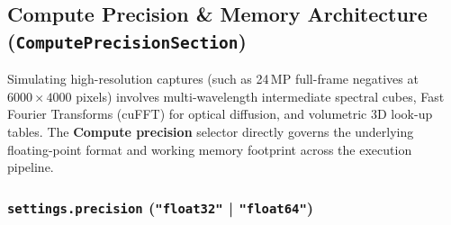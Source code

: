 \documentclass[11pt,a4paper]{article}
\begin{document}
\subsection{Compute Precision \& Memory Architecture (\texttt{ComputePrecisionSection})}

Simulating high-resolution captures (such as 24\,MP full-frame negatives at $6000 \times 4000$ pixels) involves multi-wavelength intermediate spectral cubes, Fast Fourier Transforms (cuFFT) for optical diffusion, and volumetric 3D look-up tables. The \textbf{Compute precision} selector directly governs the underlying floating-point format and working memory footprint across the execution pipeline.

\subsubsection{\texttt{settings.precision} (\texttt{"float32"} | \texttt{"float64"})}
\end{document}
